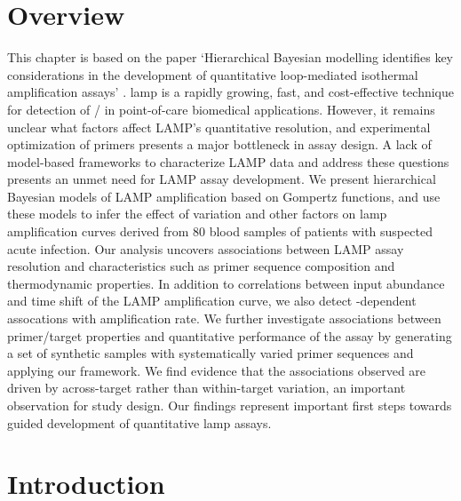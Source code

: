 \documentclass[../thesis.tex]{subfiles}
\begin{document}
\section{Overview}
This chapter is based on the paper `Hierarchical Bayesian modelling identifies key considerations in the development of quantitative loop-mediated isothermal amplification assays' \citep{bradley_hierarchical_2023}. \Gls{lamp} is a rapidly growing, fast, and cost-effective technique for detection of / in point-of-care biomedical applications. However, it remains unclear what factors affect LAMP's quantitative resolution, and experimental optimization of primers presents a major bottleneck in assay design. A lack of model-based frameworks to characterize LAMP data and address these questions presents an unmet need for LAMP assay development.
We present hierarchical Bayesian models of LAMP amplification based on Gompertz functions, and use these models to infer the effect of  variation and other factors on \gls{lamp} amplification curves derived from 80 blood samples of patients with suspected acute infection. Our analysis uncovers associations between LAMP assay resolution and characteristics such as primer sequence composition and thermodynamic properties. In addition to correlations between  input abundance and time shift of the LAMP amplification curve, we also detect -dependent assocations with amplification rate.  We further investigate associations between primer/target properties and quantitative performance of the assay by generating a set of synthetic  samples with systematically varied primer sequences and applying our framework. We find evidence that the associations observed are driven by across-target rather than within-target variation, an important observation for study design. Our findings represent important first steps towards guided development of quantitative \gls{lamp} assays.


\section{Introduction \label{sec:intro}}
\end{document}
